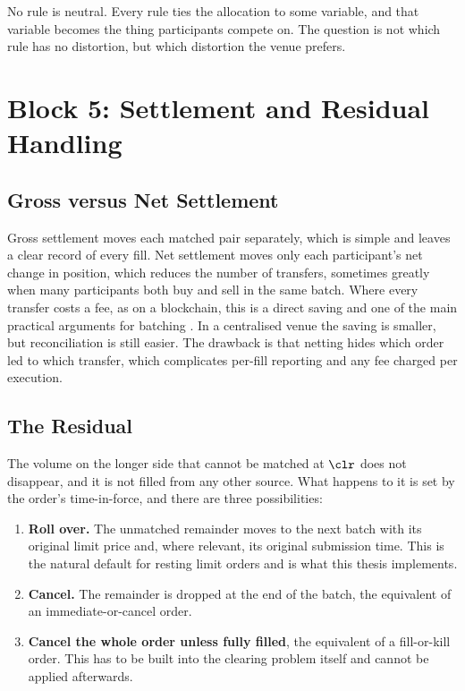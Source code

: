 No rule is neutral. Every rule ties the allocation to some variable, and that
variable becomes the thing participants compete on. The question is not which
rule has no distortion, but which distortion the venue prefers.

\section{Block 5: Settlement and Residual Handling}
\label{sec:settlement}

\subsection{Gross versus Net Settlement}

Gross settlement moves each matched pair separately, which is simple and
leaves a clear record of every fill. Net settlement moves only each
participant's net change in position, which reduces the number of transfers,
sometimes greatly when many participants both buy and sell in the same batch.
Where every transfer costs a fee, as on a blockchain, this is a direct saving
and one of the main practical arguments for batching
\citep{wang2018loopring,gong2023fbadex}. In a centralised venue the saving is
smaller, but reconciliation is still easier. The drawback is that netting
hides which order led to which transfer, which complicates per-fill reporting
and any fee charged per execution.

\subsection{The Residual}

The volume on the longer side that cannot be matched at $\clr$ does not
disappear, and it is not filled from any other source. What happens to it is
set by the order's time-in-force, and there are three possibilities:

\begin{enumerate}
  \item \textbf{Roll over.} The unmatched remainder moves to the next batch
  with its original limit price and, where relevant, its original submission
  time. This is the natural default for resting limit orders and is what this
  thesis implements.
  \item \textbf{Cancel.} The remainder is dropped at the end of the batch, the
  equivalent of an immediate-or-cancel order.
  \item \textbf{Cancel the whole order unless fully filled}, the equivalent of a
  fill-or-kill order. This has to be built into the clearing problem itself
  and cannot be applied afterwards.
\end{enumerate}

